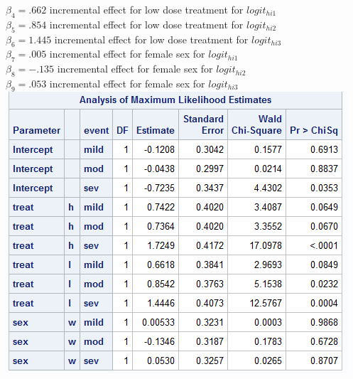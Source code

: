 \documentclass{article}
\begin{document}
\begin{flushleft}
$\beta_4=.662$ incremental effect for low dose treatment for $logit_{hi1}$ \\

$\beta_5=.854$ incremental effect for low dose treatment for $logit_{hi2}$\\

$\beta_6=1.445$ incremental effect for low dose treatment for $logit_{hi3}$\\

$\beta_7=.005$ incremental effect for female sex for $logit_{hi1}$ \\

$\beta_8=-.135$ incremental effect for female sex for $logit_{hi2}$\\

$\beta_9=.053$ incremental effect for female sex for $logit_{hi3}$\\
\includegraphics[scale=.6]{glogit.png}\\


\pagebreak

\end{flushleft}
\end{document}
